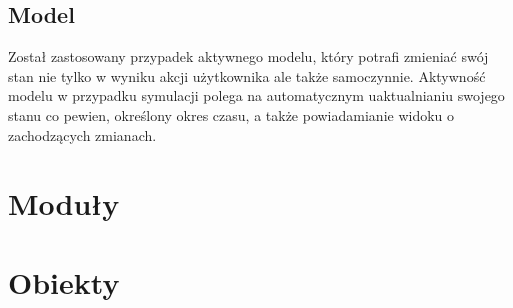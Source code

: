\subsection {Model}
Został zastosowany przypadek aktywnego modelu, który potrafi zmieniać swój stan nie tylko w wyniku
akcji użytkownika ale także samoczynnie. Aktywność modelu w przypadku symulacji polega na 
automatycznym uaktualnianiu swojego stanu co pewien, określony okres czasu, a także powiadamianie widoku o 
zachodzących zmianach.

\section {Moduły}
\section {Obiekty}
